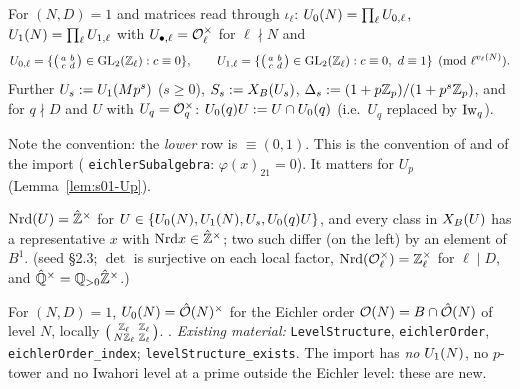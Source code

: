 \begin{definition}\label{def:s01-levels}
For $(N,D)=1$ and matrices read through $\iota_\ell$:
$U_0(N)=\prod_\ell U_{0,\ell}$, $U_1(N)=\prod_\ell U_{1,\ell}$ with $U_{\bullet,\ell}=\mathcal{O}_\ell^\times$ for $\ell\nmid N$ and
\[U_{0,\ell}=\{\left(\begin{smallmatrix}a&b\\c&d\end{smallmatrix}\right)\in\GL_2(\Z_\ell):c\equiv0\},\qquad
U_{1,\ell}=\{\left(\begin{smallmatrix}a&b\\c&d\end{smallmatrix}\right)\in\GL_2(\Z_\ell):c\equiv0,\ d\equiv1\}\pmod{\ell^{v_\ell(N)}}.\]
Further $U_s:=U_1(Mp^s)$ ($s\ge0$), $S_s:=X_B(U_s)$, $\Delta_s:=(1+p\mathbb{Z}_p)/(1+p^s\mathbb{Z}_p)$, and for $q\nmid D$ and $U$ with
$U_q=\mathcal{O}_q^\times$: $U_0(q)U:=U\cap U_0(q)$ (i.e.\ $U_q$ replaced by $\mathrm{Iw}_q$).
\end{definition}
\noindent Note the convention: the \emph{lower} row is $\equiv(0,1)$. This is the convention of
 and of the import
( \texttt{eichlerSubalgebra}: $\varphi(x)_{21}=0$). It matters for $U_p$
(Lemma~\ref{lem:s01-Up}).

\begin{lemma}\label{lem:s01-nrd}
$\mathrm{Nrd}(U)=\hat{\mathbb{Z}}^\times$ for $U\in\{U_0(N),U_1(N),U_s,U_0(q)U\}$, and every class in $X_B(U)$ has a representative $x$ with
$\mathrm{Nrd} x\in\hat{\mathbb{Z}}^\times$; two such differ (on the left) by an element of $B^1$. \stproved{} (seed \S2.3; $\det$ is surjective
on each local factor, $\mathrm{Nrd}(\mathcal{O}_\ell^\times)=\mathbb{Z}_\ell^\times$ for $\ell\mid D$, and $\hat{\mathbb{Q}}^\times=\mathbb{Q}_{>0}\hat{\mathbb{Z}}^\times$.)
\end{lemma}

\begin{proposition}\label{prop:s01-eichler}
For $(N,D)=1$, $U_0(N)=\hat{\mathcal{O}}(N)^\times$ for the Eichler order $\mathcal{O}(N)=B\cap\hat{\mathcal{O}}(N)$ of level $N$, locally
$\left(\begin{smallmatrix}\mathbb{Z}_\ell&\mathbb{Z}_\ell\\N\mathbb{Z}_\ell&\mathbb{Z}_\ell\end{smallmatrix}\right)$. \stknown{}
.
\emph{Existing material:}  \texttt{LevelStructure}, \texttt{eichlerOrder},
\texttt{eichlerOrder\_index};  \texttt{levelStructure\_exists}.
The import has \emph{no} $U_1(N)$, no $p$-tower and no Iwahori level at a prime outside the Eichler level: these are new.
\end{proposition}

